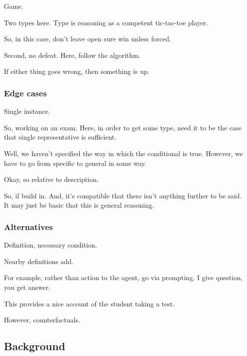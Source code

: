 \begin{note}
  \begin{illustration}
    Game.
  \end{illustration}

  Two types here.
  Type is reasoning as a competent tic-tac-toe player.

  So, in this case, don't leave open sure win unless forced.

  Second, no defeat.
  Here, follow the algorithm.

  If either thing goes wrong, then something is up.
\end{note}

\subsubsection{Edge cases}
\label{sec:not-tr0}

\begin{note}
  Single instance.

  So, working on an exam.
  Here, in order to get some type, need it to be the case that single representative is sufficient.

  Well, we haven't specified the way in which the conditional is true.
  However, we have to go from specific to general in some way.

  Okay, so relative to description.

  So, if build in.
  And, it's compatible that there isn't anything further to be said.
  It may just be basic that this is general reasoning.
\end{note}


\subsubsection{Alternatives}
\label{sec:alternatives}

\begin{note}
  Definition, necessary condition.

  Nearby definitions add.

  For example, rather than action to the agent, go via prompting.
  I give question, you get answer.

  This provides a nice account of the student taking a test.

  However, counterfactuals.
\end{note}

\subsection{Background}
\label{sec:background}



